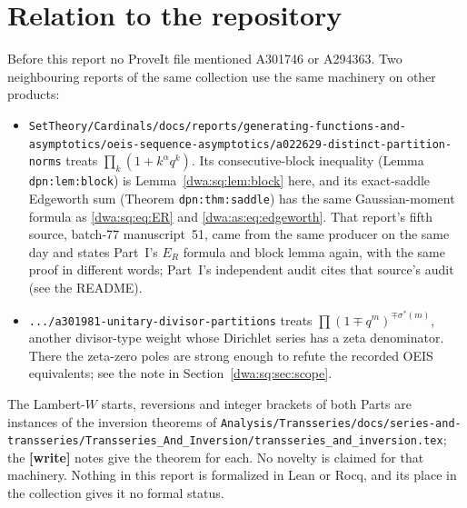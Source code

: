 \documentclass[11pt,letterpaper]{article}
\newcommand{\file}[1]{\nolinkurl{#1}}
\numberwithin{equation}{section}
\theoremstyle{remark}
\begin{document}
\section*{Relation to the repository}\label{dwa:sec:repo}
Before this report no ProveIt file mentioned A301746 or A294363. Two neighbouring reports of the same collection use the same machinery on other products:
\begin{itemize}
\item \file{SetTheory/Cardinals/docs/reports/generating-functions-and-asymptotics/oeis-sequence-asymptotics/a022629-distinct-partition-norms} treats $\prod_k(1+k^\alpha q^k)$. Its consecutive-block inequality (Lemma \texttt{dpn:lem:block}) is Lemma~\ref{dwa:sq:lem:block} here, and its exact-saddle Edgeworth sum (Theorem \texttt{dpn:thm:saddle}) has the same Gaussian-moment formula as \eqref{dwa:sq:eq:ER} and \eqref{dwa:as:eq:edgeworth}. That report's fifth source, batch-77 manuscript~51, came from the same producer on the same day and states Part~I's $E_R$ formula and block lemma again, with the same proof in different words; Part~I's independent audit cites that source's audit (see the README).
\item \file{.../a301981-unitary-divisor-partitions} treats $\prod(1\mp q^m)^{\mp\sigma^*(m)}$, another divisor-type weight whose Dirichlet series has a zeta denominator. There the zeta-zero poles are strong enough to refute the recorded OEIS equivalents; see the note in Section~\ref{dwa:sq:sec:scope}.
\end{itemize}
The Lambert-$W$ starts, reversions and integer brackets of both Parts are instances of the inversion theorems of \file{Analysis/Transseries/docs/series-and-transseries/Transseries_And_Inversion/transseries_and_inversion.tex}; the \textbf{[write]} notes give the theorem for each. No novelty is claimed for that machinery. Nothing in this report is formalized in Lean or Rocq, and its place in the collection gives it no formal status.
\end{document}
